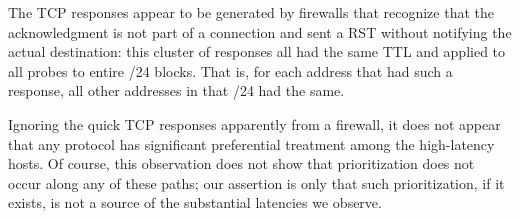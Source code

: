 The TCP responses appear to be generated by firewalls that
recognize that the acknowledgment is not part of a
connection and sent a RST without notifying the actual
destination: this cluster of responses all had the same TTL
and applied to all probes to entire /24 blocks.  That is,
for each address that had such a response, all other
addresses in that /24 had the same.

Ignoring the quick TCP responses apparently from a firewall,
it does not appear that any protocol has significant
preferential treatment among the high-latency hosts.  Of
course, this observation does not show that prioritization
does not occur along any of these paths; our assertion is
only that such prioritization, if it exists, is not a source
of the substantial latencies we observe.



% 
% 


